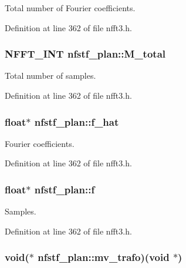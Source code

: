 Total number of Fourier coefficients. 



Definition at line 362 of file nfft3.\-h.

\hypertarget{structnfstf__plan_ab20327e7b5d79f69602853caf0988423}{
\subsubsection[{M\-\_\-total}]{\setlength{\rightskip}{0pt plus 5cm}N\-F\-F\-T\-\_\-\-I\-N\-T nfstf\-\_\-plan\-::\-M\-\_\-total}}\label{structnfstf__plan_ab20327e7b5d79f69602853caf0988423}


Total number of samples. 



Definition at line 362 of file nfft3.\-h.

\hypertarget{structnfstf__plan_ab57019bf0a7274b5a6f401fe2f6bcf2b}{
\subsubsection[{f\-\_\-hat}]{\setlength{\rightskip}{0pt plus 5cm}float$\ast$ nfstf\-\_\-plan\-::f\-\_\-hat}}\label{structnfstf__plan_ab57019bf0a7274b5a6f401fe2f6bcf2b}


Fourier coefficients. 



Definition at line 362 of file nfft3.\-h.

\hypertarget{structnfstf__plan_a178dae9cc4b5869ef69fd148efe14f93}{
\subsubsection[{f}]{\setlength{\rightskip}{0pt plus 5cm}float$\ast$ nfstf\-\_\-plan\-::f}}\label{structnfstf__plan_a178dae9cc4b5869ef69fd148efe14f93}


Samples. 



Definition at line 362 of file nfft3.\-h.

\hypertarget{structnfstf__plan_aa960f82c35501acf5237b5ed49f7fe57}{
\subsubsection[{mv\-\_\-trafo}]{\setlength{\rightskip}{0pt plus 5cm}void($\ast$ nfstf\-\_\-plan\-::mv\-\_\-trafo)(void $\ast$)}}\label{structnfstf__plan_aa960f82c35501acf5237b5ed49f7fe57}


